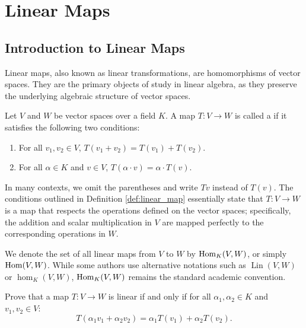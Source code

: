 \renewcommand{\thetheorem}{\arabic{chapter}.\alph{section}.\arabic{theorem}}

\setcounter{chapter}{14} %
\chapter{Linear Maps}

\section{Introduction to Linear Maps}

Linear maps, also known as linear transformations, are homomorphisms of vector spaces. They are the primary objects of study in linear algebra, as they preserve the underlying algebraic structure of vector spaces.

\begin{definition}
\label{def:linear_map}
Let $V$ and $W$ be vector spaces over a field $K$. A map $T: V \to W$ is called a  if it satisfies the following two conditions:
\begin{enumerate}
    \item For all $v_1, v_2 \in V$, $T(v_1 + v_2) = T(v_1) + T(v_2)$.
    \item For all $\alpha \in K$ and $v \in V$, $T(\alpha \cdot v) = \alpha \cdot T(v)$.
\end{enumerate}
\end{definition}

\begin{remark}
\label{rem:linear_map_notation}
In many contexts, we omit the parentheses and write $Tv$ instead of $T(v)$. The conditions outlined in Definition \ref{def:linear_map} essentially state that $T: V \to W$ is a map that respects the operations defined on the vector spaces; specifically, the addition and scalar multiplication in $V$ are mapped perfectly to the corresponding operations in $W$.

We denote the set of all linear maps from $V$ to $W$ by $\operatorname{Hom}_K(V, W)$, or simply $\operatorname{Hom}(V, W)$. While some authors use alternative notations such as $\operatorname{Lin}(V, W)$ or $\hom_K(V, W)$, $\operatorname{Hom}_K(V, W)$ remains the standard academic convention.
\end{remark}

\begin{exercise}
\label{exer:linearity_criterion}
Prove that a map $T: V \to W$ is linear if and only if for all $\alpha_1, \alpha_2 \in K$ and $v_1, v_2 \in V$:
\[
T(\alpha_1 v_1 + \alpha_2 v_2) = \alpha_1 T(v_1) + \alpha_2 T(v_2).
\]
\end{exercise}

